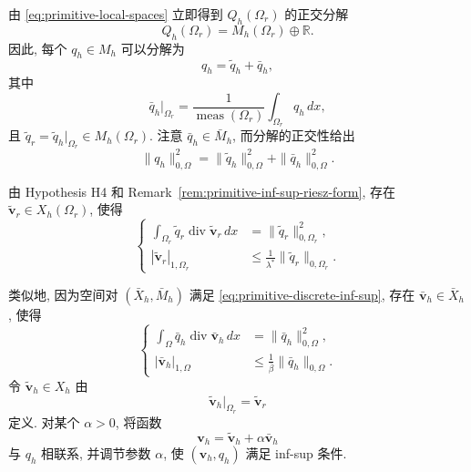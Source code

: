 \begin{Proof}
由 \eqref{eq:primitive-local-spaces} 立即得到 $Q_h(\Omega_r)$ 的正交分解
\[
Q_h(\Omega_r)=M_h(\Omega_r)\oplus\mathbb R.
\]
因此, 每个 $q_h\in M_h$ 可以分解为
\[
q_h=\tilde q_h+\bar q_h,
\]
其中
\[
\bar q_h|_{\Omega_r}
=\frac{1}{\operatorname{meas}(\Omega_r)}
\int_{\Omega_r}q_h\,dx,
\]
且 $\tilde q_r=\tilde q_h|_{\Omega_r}\in M_h(\Omega_r)$.
注意 $\bar q_h\in\bar M_h$, 而分解的正交性给出
\begin{equation}\label{eq:primitive-pressure-orthogonal-decomposition}
\|q_h\|_{0,\Omega}^2
=\|\tilde q_h\|_{0,\Omega}^2
+\|\bar q_h\|_{0,\Omega}^2.
\end{equation}

由 Hypothesis H4 和 Remark~\ref{rem:primitive-inf-sup-riesz-form},
存在 $\tilde{\mathbf v}_r\in X_h(\Omega_r)$, 使得
\begin{equation}\label{eq:primitive-local-divergence-lifting}
\left\{
\begin{aligned}
\int_{\Omega_r}\tilde q_r\operatorname{div}\tilde{\mathbf v}_r\,dx
&=\|\tilde q_r\|_{0,\Omega_r}^2,\\
|\tilde{\mathbf v}_r|_{1,\Omega_r}
&\leq\frac{1}{\lambda^*}\|\tilde q_r\|_{0,\Omega_r}.
\end{aligned}
\right.
\end{equation}

类似地, 因为空间对 $(\bar X_h,\bar M_h)$ 满足
\eqref{eq:primitive-discrete-inf-sup}, 存在 $\bar{\mathbf v}_h\in\bar X_h$, 使得
\begin{equation}\label{eq:primitive-coarse-divergence-lifting}
\left\{
\begin{aligned}
\int_\Omega\bar q_h\operatorname{div}\bar{\mathbf v}_h\,dx
&=\|\bar q_h\|_{0,\Omega}^2,\\
|\bar{\mathbf v}_h|_{1,\Omega}
&\leq\frac{1}{\bar\beta}\|\bar q_h\|_{0,\Omega}.
\end{aligned}
\right.
\end{equation}
令 $\tilde{\mathbf v}_h\in X_h$ 由
\[
\tilde{\mathbf v}_h|_{\Omega_r}=\tilde{\mathbf v}_r
\]
定义. 对某个 $\alpha>0$, 将函数
\[
\mathbf v_h=\tilde{\mathbf v}_h+\alpha\bar{\mathbf v}_h
\]
与 $q_h$ 相联系, 并调节参数 $\alpha$, 使 $(\mathbf v_h,q_h)$ 满足 inf-sup 条件.


\end{Proof}
